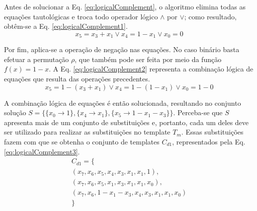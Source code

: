 Antes de solucionar a Eq. \eqref{eq:logicalComplement}, o algoritmo elimina todas as equações tautológicas e troca todo operador lógico $\wedge$ por $\vee$; como resultado, obtêm-se a Eq. \eqref{eq:logicalComplement1}.
\begin{equation}
x_5 = x_3 + x_1 \vee x_4 = 1 - x_1 \vee x_0 = 0
\label{eq:logicalComplement1}
\end{equation}

Por fim,  aplica-se a operação de negação nas equações. No caso binário basta efetuar a permutação $\rho$, que também pode ser feita por meio da função $f(x) = 1 - x$. A Eq. \eqref{eq:logicalComplement2} representa a combinação lógica de equações que resulta das operações precedentes.
\begin{equation}
x_5 = 1 - (x_3 + x_1) \vee x_4 = 1 - (1 - x_1) \vee x_0 = 1 - 0
\label{eq:logicalComplement2}
\end{equation}

A combinação lógica de equações é então solucionada, resultando no conjunto solução $S = \{\{x_0 \to 1\}, \{x_4 \to x_1\}, \{x_5 \to 1 - x_1 - x_3\}\}$. Perceba-se que $S$ apresenta mais de um conjunto de substituições e, portanto, cada um deles deve ser utilizado para realizar as substituições no template $T_m$. Essas substituições fazem com que se obtenha o conjunto de templates $C_{d1}$, representados pela Eq. \eqref{eq:logicalComplement3}. 
\begin{equation}
\begin{split}
C_{d1} = \{\\(x_7, x_6, x_5, x_4, x_3, x_1, x_1, 1), \\(x_7, x_6, x_5, x_1, x_3, x_1, x_1, x_0), \\(x_7, x_6, 1 - x_1 - x_3, x_4, x_3, x_1, x_1, x_0)\\\}
\end{split}
\label{eq:logicalComplement3}
\end{equation}

